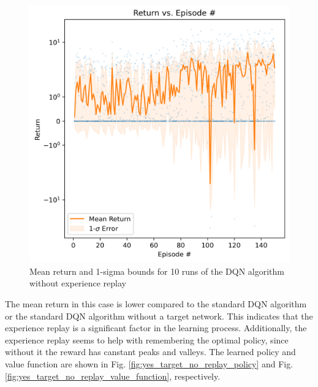 \documentclass[conference]{IEEEtran}
\begin{document}
\begin{figure}[h]
\centering
\includegraphics[width=0.95\linewidth]{../figures/yes_target_no_replay/mean_return_150_1000_log_True.png}
\caption{Mean return and 1-sigma bounds for 10 runs of the DQN algorithm without experience replay}
\label{fig:yes_target_no_replay_10_runs}
\end{figure}
The mean return in this case is lower compared to the standard DQN algorithm or the standard DQN algorithm without a target network. This indicates that the experience replay is a significant factor in the learning process. Additionally, the experience replay seems to help with remembering the optimal policy, since without it the reward has canstant peaks and valleys. The learned policy and value function are shown in Fig. \ref{fig:yes_target_no_replay_policy} and Fig. \ref{fig:yes_target_no_replay_value_function}, respectively.
\end{document}
